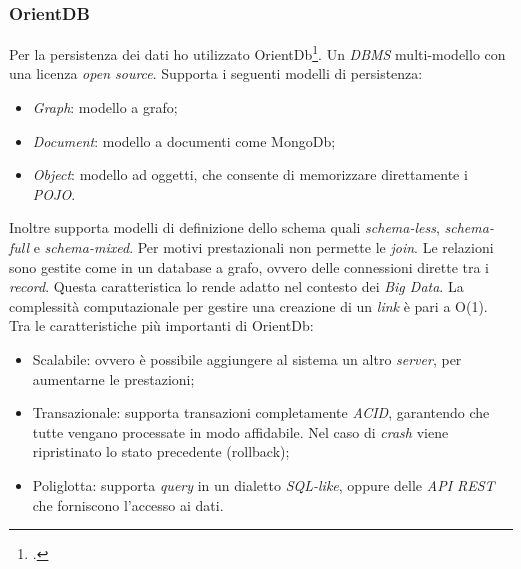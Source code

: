 \subsubsection{OrientDB}
Per la persistenza dei dati ho utilizzato OrientDb\footcite{http://orientdb.com/}. Un \emph{DBMS} multi-modello con una licenza \emph{open source}. Supporta i seguenti modelli di persistenza:
\begin{itemize}
\item \emph{Graph}: modello a grafo; 
\item \emph{Document}: modello a documenti come MongoDb;
\item \emph{Object}: modello ad oggetti, che consente di memorizzare direttamente i \emph{POJO}.
\end{itemize}
Inoltre supporta modelli di definizione dello schema quali \emph{schema-less}, \emph{schema-full} e \emph{schema-mixed}. Per motivi prestazionali non permette le \emph{join}. Le relazioni sono gestite come in un database a grafo, ovvero delle connessioni dirette tra i \emph{record}. Questa caratteristica lo rende adatto nel contesto dei \emph{Big Data}. La complessità computazionale per gestire una creazione di un \emph{link} è pari a O(1). Tra le caratteristiche più importanti di OrientDb:
\begin{itemize}
\item Scalabile: ovvero è possibile aggiungere al sistema un altro \emph{server}, per aumentarne le prestazioni;
\item Transazionale: supporta transazioni completamente \emph{ACID}, garantendo che tutte vengano processate in modo affidabile. Nel caso di \emph{crash} viene ripristinato lo stato precedente (rollback);
\item Poliglotta: supporta \emph{query} in un dialetto \emph{SQL-like}, oppure delle \emph{API REST} che forniscono l'accesso ai dati.
\end{itemize}
